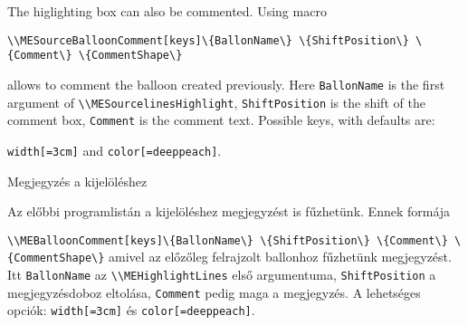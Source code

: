 {
The higlighting box can also be commented. Using macro
\par\noindent\lstinline|\\MESourceBalloonComment[keys]\{BallonName\} \{ShiftPosition\} \{Comment\} \{CommentShape\}|
\par\noindent allows to comment the balloon created previously.
Here \lstinline|BallonName| is the first argument of  \lstinline|\\MESourcelinesHighlight|,
\lstinline|ShiftPosition| is the shift of the comment box, \lstinline|Comment| is the comment text.
Possible keys, with defaults are:
\par\noindent \lstinline|width[=3cm]| and \lstinline|color[=deeppeach]|.

}
{Megjegyzés a kijelöléshez}
{
Az előbbi programlistán a kijelöléshez megjegyzést is fűzhetünk.
Ennek formája 
\par\noindent\lstinline|\\MEBalloonComment[keys]\{BallonName\} \{ShiftPosition\} \{Comment\} \{CommentShape\}|
amivel az előzőleg felrajzolt ballonhoz fűzhetünk megjegyzést.
Itt \lstinline|BallonName| az \lstinline|\\MEHighlightLines| első argumentuma,
\lstinline|ShiftPosition| a megjegyzésdoboz eltolása, \lstinline|Comment| pedig maga 
a megjegyzés.
A lehetséges opciók: \lstinline|width[=3cm]| és \lstinline|color[=deeppeach]|.

}

